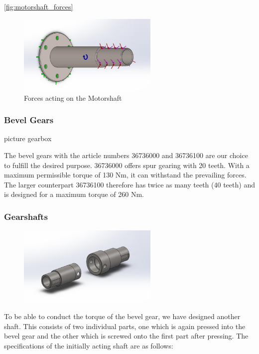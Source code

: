 \autoref{fig:motorshaft_forces}
\begin{figure}[H]
\centering
\includegraphics[width=0.6\textwidth]{texfiles/mech/eimg/propulsion/picture_forces_motorshaft}
\caption{Forces acting on the Motorshaft}
\label{fig:motorshaft_forces}
\end{figure}

\subsubsection{Bevel Gears}
picture gearbox

The bevel gears with the article numbers 36736000 and 36736100 are our choice to fulfill the desired purpose.
36736000 offers spur gearing with 20 teeth. With a maximum permissible torque of 130 Nm, it can withstand the prevailing forces. 
The larger counterpart 36736100 therefore has twice as many teeth (40 teeth) and is designed for a maximum torque of 260 Nm.

\subsubsection{Gearshafts}
\begin{figure}[H]
\centering
\includegraphics[width=0.6\textwidth]{texfiles/mech/eimg/propulsion/picture_gearshafts}
\caption{}
\label{}
\end{figure}

To be able to conduct the torque of the bevel gear, we have designed another shaft. This consists of two individual parts, one which is again pressed into the bevel gear and the other which is screwed onto the first part after pressing.
The specifications of the initially acting shaft are as follows:

